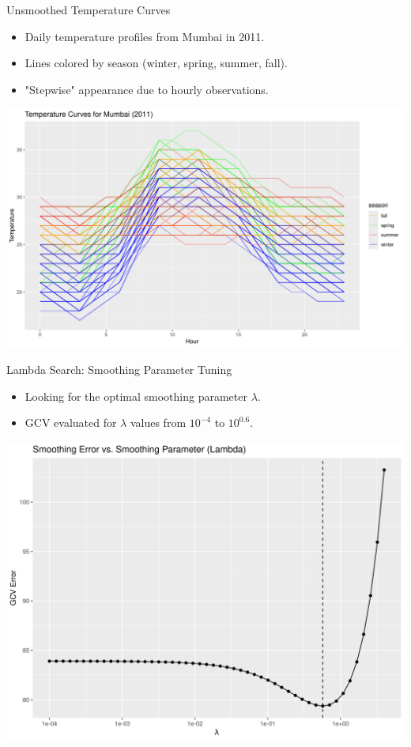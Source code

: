 \documentclass[svgnames, 12pt]{beamer}
\begin{document}
\begin{frame}{Unsmoothed Temperature Curves}
	\begin{itemize}
		\item Daily temperature profiles from Mumbai in 2011.
			\item Lines colored by season (winter, spring, summer, fall).
			\item "Stepwise" appearance due to hourly observations.
		\end{itemize}
	\begin{center}
		\includegraphics[width=0.8\linewidth]{../notebooks/assets/unsmoothed_temperature_curves.png}
	\end{center}
\end{frame}

\begin{frame}{Lambda Search: Smoothing Parameter Tuning}
    \begin{itemize}
        \item Looking for the optimal smoothing parameter \(\lambda\).
		\item GCV evaluated for \(\lambda\) values from \(10^{-4}\) to \(10^{0.6}\).
    \end{itemize}
    \vfill
    \begin{center}
        \includegraphics[width=0.7\linewidth]{../notebooks/assets/lambda_vs_gcv.png}
    \end{center}
\end{frame}
\end{document}
